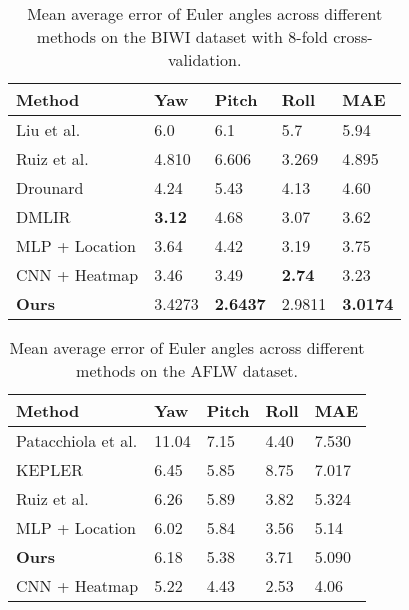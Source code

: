 \documentclass{article}
\begin{document}
\begin{CJK*}{UTF8}{gkai}
\begin{table}[htbp]
\centering
\begin{tabular}{lllll}
\hline \hline 
Method                & Yaw    & Pitch  & Roll   & MAE    \\
\hline 
Liu et al.{}\cite{liu20163d}{}    & 6.0    & 6.1    & 5.7    & 5.94   \\
\hline 
Ruiz et al.{}\cite{ruiz2017fine}{}    & 4.810  & 6.606  & 3.269  & 4.895  \\
\hline 
Drounard{}\cite{drouard2017robust}{}      & 4.24   & 5.43   & 4.13   & 4.60   \\
\hline 
DMLIR{}\cite{lathuiliere2017deep}{}         & \textbf{3.12}   & 4.68   & 3.07   & 3.62   \\
\hline 
MLP + Location{}\cite{gupta2018nose}{} & 3.64   & 4.42   & 3.19   & 3.75   \\
\hline 
CNN + Heatmap{}\cite{gupta2018nose}{}  & 3.46   & 3.49   & \textbf{2.74}   & 3.23   \\
\hline 
\textbf{Ours}                  & 3.4273 & \textbf{2.6437} & 2.9811 & \textbf{3.0174}\\
\hline \hline
\end{tabular}
\caption{Mean average error of Euler angles across different methods on the BIWI dataset with 8-fold cross-validation.}
\end{table}

\begin{table}[htbp]
\centering
\begin{tabular}{lllll}
\hline \hline 
Method                    & Yaw   & Pitch & Roll & MAE   \\
\hline 
Patacchiola et al.{}\cite{patacchiola2017head}{} & 11.04 & 7.15  & 4.40 & 7.530 \\
\hline 
KEPLER{}\cite{kumar2017kepler}{}             & 6.45  & 5.85  & 8.75 & 7.017 \\
\hline 
Ruiz et al.{}\cite{ruiz2017fine}{}        & 6.26  & 5.89  & 3.82 & 5.324 \\
\hline 
MLP + Location{}\cite{gupta2018nose}{}     & 6.02  & 5.84  & 3.56 & 5.14  \\
\hline 
\textbf{Ours}                      & 6.18  & 5.38  & 3.71 & 5.090  \\
\hline 
CNN + Heatmap{}\cite{gupta2018nose}{}      & 5.22  & 4.43  & 2.53 & 4.06 \\
\hline \hline
\end{tabular}
\caption{Mean average error of Euler angles across different methods on the AFLW dataset.}
\end{table}


\end{CJK*}
\end{document}
